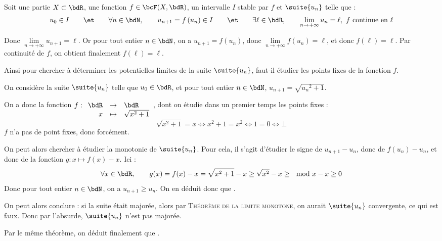 \documentclass[a4paper,french,bookmarks]{article}
\begin{document}
\begin{nproof}
    Soit une partie $X \subset \bdR$, une fonction $f \in \bcF(X, \bdR)$, un intervalle $I$ stable par $f$ et $\suite{u_n}$ telle que :
    \[ u_0 \in I \qquad\et\qquad \forall n \in \bdN,\qquad u_{n+1} = f\left(u_n\right) \in I \qquad\et\qquad \exists \ell \in \bdR,\qquad \lim\limits_{n \to +\infty} u_n = \ell,\ f \ \text{continue en} \ \ell\]
    
    Donc $\lim\limits_{n \to +\infty} u_{n+1} = \ell$. Or pour tout entier $n \in \bdN$, on a $u_{n+1} = f\left(u_n\right)$, donc $\lim\limits_{n \to +\infty} f\left(u_n\right) = \ell$, et donc $f(\ell) = \ell$. Par continuité de $f$, on obtient finalement $f(\ell) = \ell$.
\end{nproof}

Ainsi pour chercher à déterminer les potentielles limites de la suite $\suite{u_n}$, faut-il étudier les points fixes de la fonction $f$.

\begin{example}{}{}
    On considère la suite $\suite{u_n}$ telle que $u_0 \in \bdR$, et pour tout entier $n \in \bdN$, $u_{n+1} = \sqrt{{u_n}^2 + 1}$.
    
    \tcblower
    
     
    
    \begin{enumerate}
        \ithand On a donc la fonction $f : \begin{array}[t]{rcl}
            \bdR &\to& \bdR  \\
            x &\mapsto& \sqrt{x^2 + 1} 
        \end{array}$, dont on étudie dans un premier temps les points fixes :
        \[ \sqrt{x^2 + 1} = x \iff x^2 + 1 = x^2 \iff 1 = 0 \iff \bot\]
        $f$ n'a pas de point fixes, donc  forcément.
        
        \ithand On peut alors chercher à étudier la monotonie de $\suite{u_n}$. Pour cela, il s'agit d'étudier le signe de $u_{n+1} - u_n$, donc de $f\left(u_n\right) - u_n$, et donc de la fonction $g : x \mapsto f(x) - x$. Ici :
        \[ \forall x \in \bdR,\qquad g(x) = f(x) - x = \sqrt{x^2 + 1} - x \geq \sqrt{x^2} - x \geq \mod{x} - x \geq 0\]
        Donc pour tout entier $n \in \bdN$, on a $u_{n+1} \geq u_n$. On en déduit donc que .
        
        \ithand On peut alors conclure : si la suite était majorée, alors par \textsc{Théorème de la limite monotone}, on aurait $\suite{u_n}$ convergente, ce qui est faux. Donc par l'absurde, $\suite{u_n}$ n'est pas majorée.
        
        Par le même théorème, on déduit finalement que .
    \end{enumerate}
\end{example}
\end{document}
